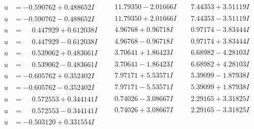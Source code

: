 \documentclass[1p]{elsarticle_modified}
\theoremstyle{definition}
\begin{document}
$$\begin{array}{c|c|c}
\begin{aligned}
u &= -0.590762 + 0.488652 I\end{aligned}
 & \phantom{-}11.79350 - 2.01666 I & \phantom{-}7.44353 + 3.51119 I \\ \hline\begin{aligned}
u &= -0.590762 - 0.488652 I\end{aligned}
 & \phantom{-}11.79350 + 2.01666 I & \phantom{-}7.44353 - 3.51119 I \\ \hline\begin{aligned}
u &= \phantom{-}0.447929 + 0.612038 I\end{aligned}
 & \phantom{-}4.96768 + 0.96718 I & \phantom{-}0.97174 - 3.83444 I \\ \hline\begin{aligned}
u &= \phantom{-}0.447929 - 0.612038 I\end{aligned}
 & \phantom{-}4.96768 - 0.96718 I & \phantom{-}0.97174 + 3.83444 I \\ \hline\begin{aligned}
u &= \phantom{-}0.539062 + 0.483661 I\end{aligned}
 & \phantom{-}3.70641 + 1.86423 I & \phantom{-}6.68982 - 4.28103 I \\ \hline\begin{aligned}
u &= \phantom{-}0.539062 - 0.483661 I\end{aligned}
 & \phantom{-}3.70641 - 1.86423 I & \phantom{-}6.68982 + 4.28103 I \\ \hline\begin{aligned}
u &= -0.605762 + 0.352402 I\end{aligned}
 & \phantom{-}7.97171 + 5.53571 I & \phantom{-}5.39099 - 1.87938 I \\ \hline\begin{aligned}
u &= -0.605762 - 0.352402 I\end{aligned}
 & \phantom{-}7.97171 - 5.53571 I & \phantom{-}5.39099 + 1.87938 I \\ \hline\begin{aligned}
u &= \phantom{-}0.572553 + 0.344141 I\end{aligned}
 & \phantom{-}0.74026 - 3.08667 I & \phantom{-}2.29165 + 3.31825 I \\ \hline\begin{aligned}
u &= \phantom{-}0.572553 - 0.344141 I\end{aligned}
 & \phantom{-}0.74026 + 3.08667 I & \phantom{-}2.29165 - 3.31825 I \\ \hline\begin{aligned}
u &= -0.503120 + 0.331554 I\end{aligned}

\end{array}$$
\end{document}
